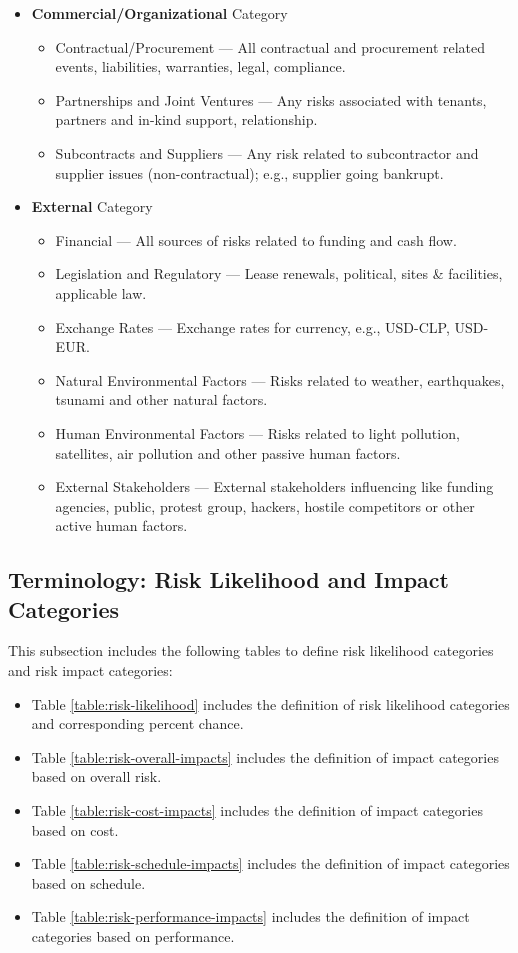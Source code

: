 \begin{itemize}
\begin{itemize}
		\end{itemize}
	\item \textbf{Commercial/Organizational} Category
		\begin{itemize}
			\item Contractual/Procurement --- All contractual and procurement related events, liabilities, warranties, legal, compliance.
			\item Partnerships and Joint Ventures --- Any risks associated with tenants, partners and in-kind support, relationship.
			\item Subcontracts and Suppliers --- Any risk related to subcontractor and supplier issues (non-contractual); e.g., supplier going bankrupt.
		\end{itemize}
	\item \textbf{External} Category
		\begin{itemize}
			\item Financial --- All sources of risks related to funding and cash flow.
			\item Legislation and Regulatory --- Lease renewals, political, sites \& facilities, applicable law.
			\item Exchange Rates --- Exchange rates for currency, e.g., USD-CLP, USD-EUR.
			\item Natural Environmental Factors --- Risks related to weather, earthquakes, tsunami and other natural factors.
			\item Human Environmental Factors --- Risks related to light pollution, satellites, air pollution and other passive human factors.
			\item External Stakeholders --- External stakeholders influencing like funding agencies, public, protest group, hackers, hostile competitors or other active human factors.
		\end{itemize}
\end{itemize}

\subsection{Terminology: Risk Likelihood and Impact Categories}
\label{sec:risk-impact-tables}

This subsection includes the following tables to define risk likelihood categories and risk impact categories:
\begin{itemize}
	\item Table \ref{table:risk-likelihood} includes the definition of risk likelihood categories and corresponding percent chance.
	\item Table \ref{table:risk-overall-impacts} includes the definition of impact categories based on overall risk.
	\item Table \ref{table:risk-cost-impacts} includes the definition of impact categories based on cost.
	\item Table \ref{table:risk-schedule-impacts} includes the definition of impact categories based on schedule.
	\item Table \ref{table:risk-performance-impacts} includes the definition of impact categories based on performance.
\end{itemize}

